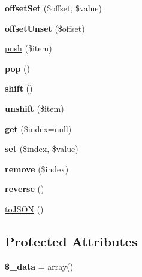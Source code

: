\begin{DoxyCompactItemize}
\item 
\hypertarget{classArrayList_a90473248c6f6b2fa58717cb2bedbc94e}{
{\bfseries offsetSet} (\$offset, \$value)}
\label{classArrayList_a90473248c6f6b2fa58717cb2bedbc94e}

\item 
\hypertarget{classArrayList_a32abe6ce9d3649778a3b146c953fad3b}{
{\bfseries offsetUnset} (\$offset)}
\label{classArrayList_a32abe6ce9d3649778a3b146c953fad3b}

\item 
\hyperlink{classArrayList_af8a43bf653ecd0dc477c89d525ca1695}{push} (\$item)
\item 
\hypertarget{classArrayList_ac1d51079cc61e1e94ad1766a1842a97f}{
{\bfseries pop} ()}
\label{classArrayList_ac1d51079cc61e1e94ad1766a1842a97f}

\item 
\hypertarget{classArrayList_a4d3b61218b90023d52486c6b3dbcf314}{
{\bfseries shift} ()}
\label{classArrayList_a4d3b61218b90023d52486c6b3dbcf314}

\item 
\hypertarget{classArrayList_a197cee959e624c083c4285754af05680}{
{\bfseries unshift} (\$item)}
\label{classArrayList_a197cee959e624c083c4285754af05680}

\item 
\hypertarget{classArrayList_ab98a7fb4149de5e31b39fe0bbe4d435e}{
{\bfseries get} (\$index=null)}
\label{classArrayList_ab98a7fb4149de5e31b39fe0bbe4d435e}

\item 
\hypertarget{classArrayList_a70cffc1017606dc401bacef19a4b2f42}{
{\bfseries set} (\$index, \$value)}
\label{classArrayList_a70cffc1017606dc401bacef19a4b2f42}

\item 
\hypertarget{classArrayList_a10020679f12e299af894de406eb4f34e}{
{\bfseries remove} (\$index)}
\label{classArrayList_a10020679f12e299af894de406eb4f34e}

\item 
\hypertarget{classArrayList_a04aef6ed21c038bf15e708a8dea8c7d1}{
{\bfseries reverse} ()}
\label{classArrayList_a04aef6ed21c038bf15e708a8dea8c7d1}

\item 
\hyperlink{classArrayList_ae15f74916c7173d961d6cc850776e1ae}{toJSON} ()
\end{DoxyCompactItemize}
\subsection*{Protected Attributes}
\begin{DoxyCompactItemize}
\item 
\hypertarget{classArrayList_aa2020764364f5af7bde0001145eb1e04}{
{\bfseries \$\_\-data} = array()}
\label{classArrayList_aa2020764364f5af7bde0001145eb1e04}

\end{DoxyCompactItemize}


